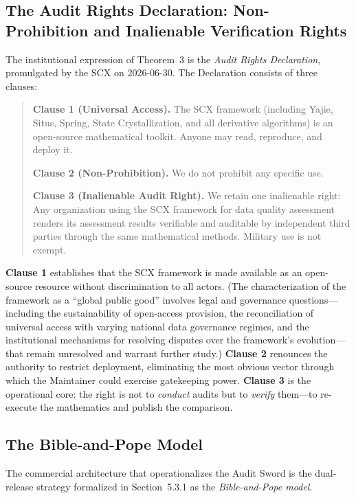 \documentclass[12pt,a4paper]{article}
\theoremstyle{definition}
\theoremstyle{remark}
\begin{document}
\subsection{The Audit Rights Declaration: Non-Prohibition and Inalienable Verification Rights}

The institutional expression of Theorem~3 is the \textit{Audit Rights Declaration}, promulgated by the SCX on 2026-06-30. The Declaration consists of three clauses:

\begin{quote}
\textbf{Clause 1 (Universal Access).} The SCX framework (including Yajie, Situs, Spring, State Crystallization, and all derivative algorithms) is an open-source mathematical toolkit. Anyone may read, reproduce, and deploy it.

\textbf{Clause 2 (Non-Prohibition).} We do not prohibit any specific use.

\textbf{Clause 3 (Inalienable Audit Right).} We retain one inalienable right: Any organization using the SCX framework for data quality assessment renders its assessment results verifiable and auditable by independent third parties through the same mathematical methods. Military use is not exempt.
\end{quote}

\textbf{Clause 1} establishes that the SCX framework is made available as an open-source resource without discrimination to all actors. (The characterization of the framework as a ``global public good'' involves legal and governance questions—including the sustainability of open-access provision, the reconciliation of universal access with varying national data governance regimes, and the institutional mechanisms for resolving disputes over the framework's evolution—that remain unresolved and warrant further study.) \textbf{Clause 2} renounces the authority to restrict deployment, eliminating the most obvious vector through which the Maintainer could exercise gatekeeping power. \textbf{Clause 3} is the operational core: the right is not to \textit{conduct} audits but to \textit{verify} them—to re-execute the mathematics and publish the comparison.

\subsection{The Bible-and-Pope Model}

The commercial architecture that operationalizes the Audit Sword is the dual-release strategy formalized in Section~5.3.1 as the \textit{Bible-and-Pope model}.
\end{document}
